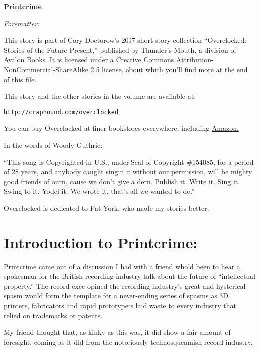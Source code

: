 



\raggedbottom

\begin{center}
\textbf{\huge\textsf{{Printcrime}}}
\end{center}


\emph{Forematter:}

This story is part of Cory Doctorow’s 2007 short story collection
“Overclocked: Stories of the Future Present,” published by
Thunder’s Mouth, a division of Avalon Books. It is licensed under a
Creative Commons Attribution-NonCommercial-ShareAlike 2.5 license,
about which you’ll find more at the end of this file.

This story and the other stories in the volume are available at:

\texttt{http://craphound.com/overclocked}

You can buy Overclocked at finer bookstores everywhere, including
\href{http://www.amazon.com/exec/obidos/ASIN/1560259817/downandoutint-20}{Amazon.}

In the words of Woody Guthrie:

“This song is Copyrighted in U.S., under Seal of Copyright
\#154085, for a period of 28 years, and anybody caught singin it
without our permission, will be mighty good friends of ourn, cause
we don’t give a dern. Publish it. Write it. Sing it. Swing to it.
Yodel it. We wrote it, that’s all we wanted to do.”

Overclocked is dedicated to Pat York, who made my stories better.

\section{Introduction to Printcrime:}

Printcrime came out of a discussion I had with a friend who’d been
to hear a spokesman for the British recording industry talk about
the future of “intellectual property.” The record exec opined the
recording industry’s great and hysterical spasm would form the
template for a never-ending series of spasms as 3D printers,
fabricators and rapid prototypers laid waste to every industry that
relied on trademarks or patents.

My friend thought that, as kinky as this was, it did show a fair
amount of foresight, coming as it did from the notoriously
technosqueamish record industry.

